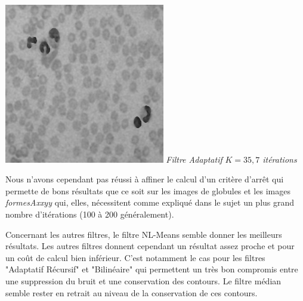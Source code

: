 \documentclass[a4,12pt]{article}
\begin{document}
\noindent
\begin{center}
	\begin{minipage}[c]{0.45\linewidth}
		\begin{center}
			\includegraphics[width = 70mm]{./img/globAdaptMoinsInt.jpg}
			\textit{Filtre Adaptatif}
			\textit{$K = 35, 7$ itérations}\
		\end{center}
	\end{minipage}
\end{center}

Nous n'avons cependant pas réussi à affiner le calcul d'un critère d'arrêt qui permette de bons résultats que ce soit sur les images de globules et les images \textit{formesAxxyy} qui, elles, nécessitent comme expliqué dans le sujet un plus grand nombre d'itérations (100 à 200 généralement).


Concernant les autres filtres, le filtre NL-Means semble donner les meilleurs résultats. Les autres filtres donnent cependant un résultat assez proche et pour un coût de calcul bien inférieur. C'est notamment le cas pour les filtres "Adaptatif Récursif" et "Bilinéaire" qui permettent un très bon compromis entre une suppression du bruit et une conservation des contours. Le filtre médian semble rester en retrait au niveau de la conservation de ces contours.

\end{document}
